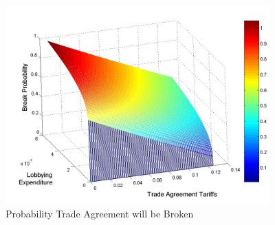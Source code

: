 \documentclass[10pt]{article}
\begin{document}
\begin{figure}
\begin{center}
\includegraphics[height=3in, width=4in]{brprob2.jpg}
\end{center}
\caption{Probability Trade Agreement will be Broken\label{fig:br}}
\end{figure}

\end{document}
